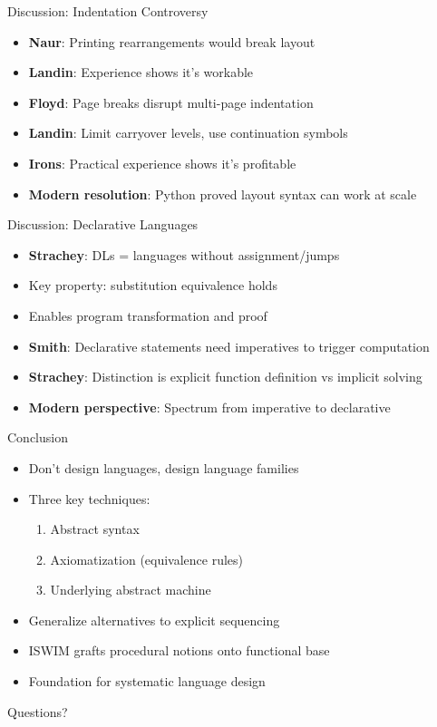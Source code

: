 \documentclass[10pt]{beamer}
\begin{document}
\begin{frame}{Discussion: Indentation Controversy}
\begin{itemize}
\item \textbf{Naur}: Printing rearrangements would break layout
\item \textbf{Landin}: Experience shows it's workable
\item \textbf{Floyd}: Page breaks disrupt multi-page indentation
\item \textbf{Landin}: Limit carryover levels, use continuation symbols
\item \textbf{Irons}: Practical experience shows it's profitable
\item \textbf{Modern resolution}: Python proved layout syntax can work at scale
\end{itemize}
\end{frame}

\begin{frame}{Discussion: Declarative Languages}
\begin{itemize}
\item \textbf{Strachey}: DLs = languages without assignment/jumps
\item Key property: substitution equivalence holds
\item Enables program transformation and proof
\item \textbf{Smith}: Declarative statements need imperatives to trigger computation
\item \textbf{Strachey}: Distinction is explicit function definition vs implicit solving
\item \textbf{Modern perspective}: Spectrum from imperative to declarative
\end{itemize}
\end{frame}

\begin{frame}{Conclusion}
\begin{itemize}
\item Don't design languages, design language families
\item Three key techniques:
  \begin{enumerate}
  \item Abstract syntax
  \item Axiomatization (equivalence rules)
  \item Underlying abstract machine
  \end{enumerate}
\item Generalize alternatives to explicit sequencing
\item ISWIM grafts procedural notions onto functional base
\item Foundation for systematic language design
\end{itemize}
\end{frame}

\begin{frame}
\centering
\Large Questions?
\end{frame}
\end{document}
